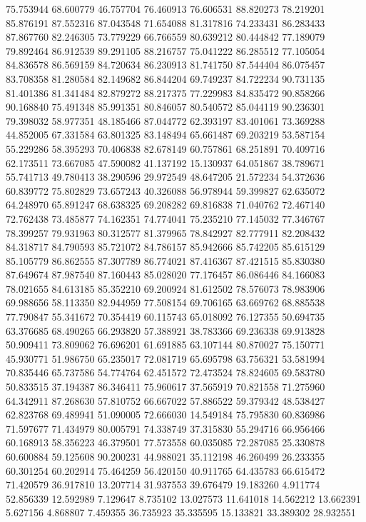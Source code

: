 75.753944
68.600779
46.757704
76.460913
76.606531
88.820273
78.219201
85.876191
87.552316
87.043548
71.654088
81.317816
74.233431
86.283433
87.867760
82.246305
73.779229
66.766559
80.639212
80.444842
77.189079
79.892464
86.912539
89.291105
88.216757
75.041222
86.285512
77.105054
84.836578
86.569159
84.720634
86.230913
81.741750
87.544404
86.075457
83.708358
81.280584
82.149682
86.844204
69.749237
84.722234
90.731135
81.401386
81.341484
82.879272
88.217375
77.229983
84.835472
90.858266
90.168840
75.491348
85.991351
80.846057
80.540572
85.044119
90.236301
79.398032
58.977351
48.185466
87.044772
62.393197
83.401061
73.369288
44.852005
67.331584
63.801325
83.148494
65.661487
69.203219
53.587154
55.229286
58.395293
70.406838
82.678149
60.757861
68.251891
70.409716
62.173511
73.667085
47.590082
41.137192
15.130937
64.051867
38.789671
55.741713
49.780413
38.290596
29.972549
48.647205
21.572234
54.372636
60.839772
75.802829
73.657243
40.326088
56.978944
59.399827
62.635072
64.248970
65.891247
68.638325
69.208282
69.816838
71.040762
72.467140
72.762438
73.485877
74.162351
74.774041
75.235210
77.145032
77.346767
78.399257
79.931963
80.312577
81.379965
78.842927
82.777911
82.208432
84.318717
84.790593
85.721072
84.786157
85.942666
85.742205
85.615129
85.105779
86.862555
87.307789
86.774021
87.416367
87.421515
85.830380
87.649674
87.987540
87.160443
85.028020
77.176457
86.086446
84.166083
78.021655
84.613185
85.352210
69.200924
81.612502
78.576073
78.983906
69.988656
58.113350
82.944959
77.508154
69.706165
63.669762
68.885538
77.790847
55.341672
70.354419
60.115743
65.018092
76.127355
50.694735
63.376685
68.490265
66.293820
57.388921
38.783366
69.236338
69.913828
50.909411
73.809062
76.696201
61.691885
63.107144
80.870027
75.150771
45.930771
51.986750
65.235017
72.081719
65.695798
63.756321
53.581994
70.835446
65.737586
54.774764
62.451572
72.473524
78.824605
69.583780
50.833515
37.194387
86.346411
75.960617
37.565919
70.821558
71.275960
64.342911
87.268630
57.810752
66.667022
57.886522
59.379342
48.538427
62.823768
69.489941
51.090005
72.666030
14.549184
75.795830
60.836986
71.597677
71.434979
80.005791
74.338749
37.315830
55.294716
66.956466
60.168913
58.356223
46.379501
77.573558
60.035085
72.287085
25.330878
60.600884
59.125608
90.200231
44.988021
35.112198
46.260499
26.233355
60.301254
60.202914
75.464259
56.420150
40.911765
64.435783
66.615472
71.420579
36.917810
13.207714
31.937553
39.676479
19.183260
4.911774
52.856339
12.592989
7.129647
8.735102
13.027573
11.641018
14.562212
13.662391
5.627156
4.868807
7.459355
36.735923
35.335595
15.133821
33.389302
28.932551
